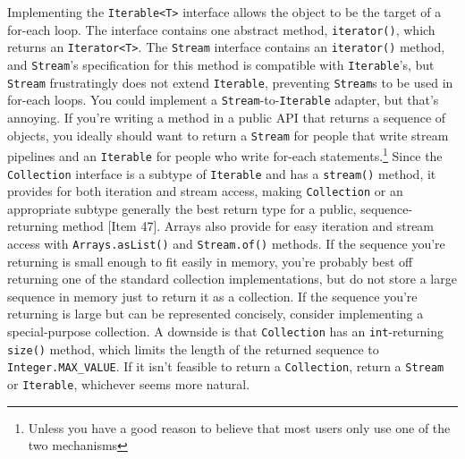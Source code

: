 \documentclass[table, xcdraw]{article}%
\begin{document}
Implementing the \texttt{Iterable<T>} interface allows the object to be the target of a for-each loop. The interface contains one abstract method, \texttt{iterator()}, which returns an \texttt{Iterator<T>}. The \texttt{Stream} interface contains an \texttt{iterator()} method, and \texttt{Stream}’s specification for this method is compatible with \texttt{Iterable}’s, but \texttt{Stream} frustratingly does not extend \texttt{Iterable}, preventing \texttt{Stream}s to be used in for-each loops. You could implement a \texttt{Stream}-to-\texttt{Iterable} adapter, but that's annoying. If you’re writing a method in a public API that returns a sequence of objects, you ideally should want to return a \texttt{Stream} for people that write stream pipelines and an \texttt{Iterable} for people who write for-each statements.\footnote{Unless you have a good reason to believe that most users only use one of the two mechanisms} Since the \texttt{Collection} interface is a subtype of \texttt{Iterable} and has a \texttt{stream()} method, it provides for both iteration and stream access, making \texttt{Collection} or an appropriate subtype generally the best return type for a public, sequence-returning method [Item 47]. Arrays also provide for easy iteration and stream access with \texttt{Arrays.asList()} and \texttt{Stream.of()} methods. If the sequence you’re returning is small enough to fit easily in memory, you’re probably best off returning one of the standard collection implementations, but do not store a large sequence in memory just to return it as a collection. If the sequence you’re returning is large but can be represented concisely, consider implementing a special-purpose collection. A downside is that \texttt{Collection} has an \texttt{int}-returning \texttt{size()} method, which limits the length of the returned sequence to \texttt{Integer.MAX_VALUE}. If it isn’t feasible to return a \texttt{Collection}, return a \texttt{Stream} or \texttt{Iterable}, whichever seems more natural.
\end{document}
